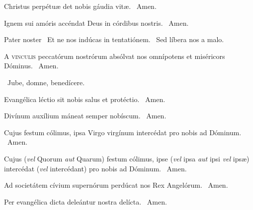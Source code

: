 
 Christus perpétuæ det nobis gáudia vitæ. \R\ Amen.


 Ignem sui amóris accéndat Deus in córdibus nostris. \R\ Amen.




Pater noster  \V\ Et ne nos indúcas in tentatiónem. \R\ Sed líbera nos a malo.


\lettrine[lines=2]{A}{} \textsc{vinculis} peccatórum nostrórum absólvat nos omnípotens et miséricors Dóminus. \R\ Amen.

\V\ Jube, domne, benedícere.


 Evangélica léctio sit nobis salus et protéctio. \R\ Amen.



 Divínum auxílium máneat semper nobíscum. \R\ Amen.


 Cujus festum cólimus, ipsa Virgo virgínum intercédat pro nobis ad Dóminum. \R\ Amen.


 Cujus (\textit{vel} Quorum \textit{aut} Quarum) festum cólimus, ipse (\textit{vel} ipsa \textit{aut} ipsi \textit{vel} ipsæ) intercédat (\textit{vel} intercédant) pro nobis ad Dóminum. \R\ Amen.


 Ad societátem cívium supernórum perdúcat nos Rex Angelórum. \R\ Amen.


 Per evangélica dicta deleántur nostra delícta. \R\ Amen.

